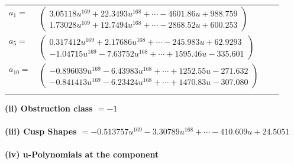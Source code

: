 \documentclass[1p]{elsarticle_modified}
\theoremstyle{definition}
\begin{document}
\begin{tabular}{m{7pt} m{180pt} m{7pt} m{180pt} }
\flushright $a_{1}=$&$\begin{pmatrix}3.05118 u^{169}+22.3493 u^{168}+\cdots-4601.86 u+988.759\\1.73028 u^{169}+12.7494 u^{168}+\cdots-2868.52 u+600.253\end{pmatrix}$ \\
\flushright $a_{5}=$&$\begin{pmatrix}0.317412 u^{169}+2.17686 u^{168}+\cdots-245.983 u+62.9293\\-1.04715 u^{169}-7.63752 u^{168}+\cdots+1595.46 u-335.601\end{pmatrix}$ \\
\flushright $a_{10}=$&$\begin{pmatrix}-0.896039 u^{169}-6.43983 u^{168}+\cdots+1252.55 u-271.632\\-0.841413 u^{169}-6.23424 u^{168}+\cdots+1470.83 u-307.080\end{pmatrix}$\\&\end{tabular}
\flushleft \textbf{(ii) Obstruction class $= -1$}\\~\\
\flushleft \textbf{(iii) Cusp Shapes $= -0.513757 u^{169}-3.30789 u^{168}+\cdots-410.609 u+24.5051$}\\~\\
\newpage\renewcommand{\arraystretch}{1}
\flushleft \textbf{(iv) u-Polynomials at the component}\newline \\
\end{document}
